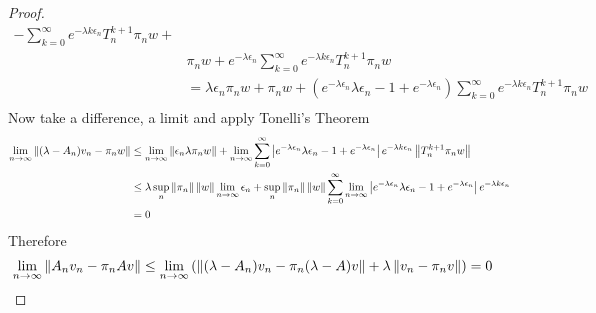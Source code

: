 \begin{proof}
\begin{align*}
- \sum_{k=0}^\infty e^{-\lambda k \epsilon_n} T_n^{k+1} \pi_n w +  \\
&\pi_n w  +
e^{-\lambda \epsilon_n}  \sum_{k=0}^\infty e^{-\lambda k \epsilon_n} T_n^{k+1} \pi_n w \\
&= \lambda \epsilon_n \pi_n w 
+ \pi_n w  + 
(e^{-\lambda \epsilon_n} \lambda \epsilon_n -1 + e^{-\lambda \epsilon_n} ) \sum_{k=0}^\infty e^{-\lambda k \epsilon_n} T_n^{k+1} \pi_n w \\
\end{align*}
Now take a difference, a limit and apply Tonelli's Theorem 
\begin{align*}
\lim_{n \to \infty} \left \lVert (\lambda - A_n) v_n - \pi_n w \right \rVert &\leq 
\lim_{n \to \infty} \left \lVert \epsilon_n \lambda \pi_n w \right \rVert + \lim_{n \to \infty} \sum_{k=0}^\infty \left \vert e^{-\lambda \epsilon_n} \lambda \epsilon_n -1 + e^{-\lambda \epsilon_n}  \right \vert
e^{-\lambda k \epsilon_n} \left \lVert T_n^{k+1} \pi_n w \right \rVert \\
&\leq \lambda \sup_n \left \lVert \pi_n \right \rVert \left \lVert w \right \rVert \lim_{n \to \infty} \epsilon_n + \sup_n \left \lVert \pi_n \right \rVert \left \lVert w \right \rVert \sum_{k=0}^\infty \lim_{n \to \infty} \left \vert e^{-\lambda \epsilon_n} \lambda \epsilon_n -1 + e^{-\lambda \epsilon_n}  \right \vert
e^{-\lambda k \epsilon_n}  \\
&= 0
\end{align*}
Therefore 
\begin{align*}
\lim_{n \to \infty} \left \lVert A_n v_n - \pi_n A v \right \rVert &\leq \lim_{n \to \infty} \left( \left \lVert (\lambda - A_n) v_n - \pi_n (\lambda - A) v \right \rVert + \lambda \left \lVert v_n - \pi_n v \right \rVert \right) = 0
\end{align*}


\end{proof}
